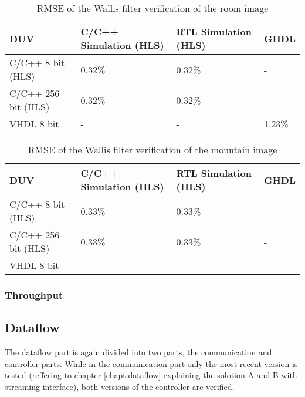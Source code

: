 \begin{table}[tb!]
    \centering
    \begin{tabular}{l l l l}
        \toprule
        DUV & C/C++ Simulation (HLS) & RTL Simulation (HLS) & GHDL \\
        \midrule
        C/C++ 8 bit (HLS) & 0.32\% & 0.32\% & -\\
        C/C++ 256 bit (HLS) & 0.32\% & 0.32\% & - \\
        VHDL 8 bit & - & - & 1.23\% \\
        \bottomrule
    \end{tabular}
    \caption{RMSE of the Wallis filter verification of the room image}
    \label{tab:rmse_room}
\end{table}

\begin{table}[tb!]
    \centering
    \begin{tabular}{l l l l}
        \toprule
        DUV & C/C++ Simulation (HLS) & RTL Simulation (HLS) & GHDL \\
        \midrule
        C/C++ 8 bit (HLS) & 0.33\% & 0.33\% & - \\
        C/C++ 256 bit (HLS) & 0.33\% & 0.33\% & - \\
        VHDL 8 bit & - & - & \\
        \bottomrule
    \end{tabular}
    \caption{RMSE of the Wallis filter verification of the mountain image}
    \label{tab:rmse_mountain}
\end{table}





\subsubsection*{Throughput}


%
%
\subsection{Dataflow}\label{ch:verification:dataflow}
The dataflow part is again divided into two parts, the communication and
controller parts. While in the communication part only the most recent version
is tested (reffering to chapter \ref{chapt:dataflow} explaining the solotion
A and B with streaming interface), both versions of the controller are verified.

